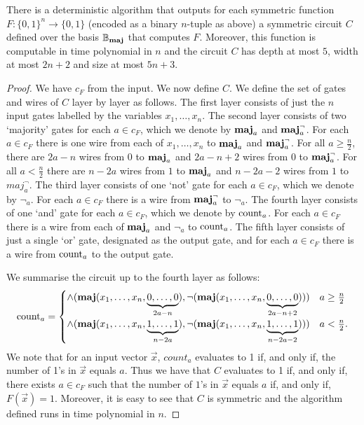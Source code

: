 \documentclass[../paper.tex]{subfiles}
\begin{document}
\begin{prop}
  \label{prop:fuctions-maj}
  There is a deterministic algorithm that outputs for each symmetric function
  $F: \{0,1\}^n \rightarrow \{0,1\}$ (encoded as a binary $n$-tuple as above) a symmetric circuit $C$ defined over
  the basis $\mathbb{B}_{\text{\textbf{maj}}}$ that computes $F$. Moreover, this function is
  computable in time polynomial in $n$ and the circuit $C$ has depth at most
  $5$, width at most $2n+2$ and size at most $5n + 3$.
\end{prop}

\begin{proof}
  We have $c_{F}$ from the input. We now define $C$. We define the set of
  gates and wires of $C$ layer by layer as follows. The first layer consists
  of just the $n$ input gates labelled by the variables $x_1, \ldots , x_n$. The
  second layer consists of two `majority' gates for each $a \in c_{F}$, which
  we denote by $\text{\textbf{maj}}_a$ and $\text{\textbf{maj}}^{\neg}_a$. For each $a \in c_{F}$ there is
  one wire from each of $x_1, \ldots , x_n$ to $\text{\textbf{maj}}_a$ and $\text{\textbf{maj}}^{\neg}_a$. For
  all $a \geq \frac{n}{2}$, there are $2a - n$ wires from $0$ to $\text{\textbf{maj}}_a$ and
  $2a - n + 2$ wires from $0$ to $\text{\textbf{maj}}^{\neg}_a$. For all $a < \frac{n}{2}$
  there are $n - 2a$ wires from $1$ to $\text{\textbf{maj}}_a$ and $n - 2a - 2$ wires from $1$
  to $maj^{\neg}_a$. The third layer consists of one `not' gate for each $a \in
  c_{F}$, which we denote by $\neg_a$. For each $a \in c_{F}$ there is a
  wire from $\text{\textbf{maj}}^\neg_a$ to $\neg_a$. The fourth layer consists of one `and'
  gate for each $a \in c_{F}$, which we denote by $\text{count}_a$. For each $a
  \in c_{F}$ there is a wire from each of $\text{\textbf{maj}}_a$ and $\neg_a$ to
  $\text{count}_a$. The fifth layer consists of just a single `or' gate,
  designated as the output gate, and for each $a \in c_{F}$ there is a wire
  from $\text{count}_a$ to the output gate.

  We summarise the circuit up to the fourth layer as follows:
  \[
    \text{count}_a = \begin{cases} \land ( \text{\textbf{maj}} ( x_1, \ldots, x_n, \underbrace
      {0, \ldots, 0}_{2a - n} ), \neg ( \text{\textbf{maj}} (x_1, \ldots , x_n, \underbrace{0,
        \ldots,
        0}_{2a - n + 2} ) )) &  a \geq \frac{n}{2} \\
      \land ( \text{\textbf{maj}} ( x_1, \ldots, x_n, \underbrace {1, \ldots, 1}_{n - 2a} ),
      \neg ( \text{\textbf{maj}} ( x_1, \ldots , x_n, \underbrace{1, \ldots, 1}_{n - 2a -2} )
      )) & a < \frac{n}{2}.
    \end{cases}
  \]
  We note that for an input vector $\vec{x}$, $count_a$ evaluates to 1 if, and
  only if, the number of 1's in $\vec{x}$ equals $a$. Thus we have that $C$
  evaluates to 1 if, and only if, there exists $a \in c_{F}$ such that the
  number of $1$'s in $\vec{x}$ equals $a$ if, and only if, $F (\vec{x}) = 1$.
  Moreover, it is easy to see that $C$ is symmetric and the algorithm defined
  runs in time polynomial in $n$.


\end{proof}
\end{document}
